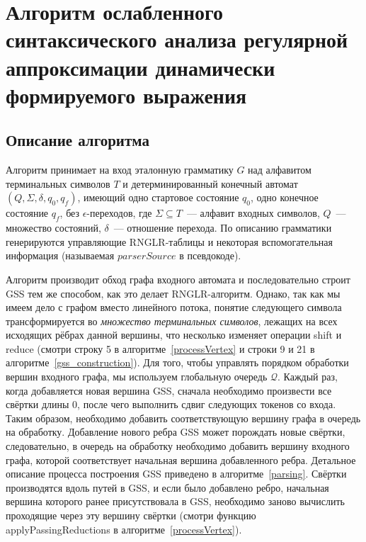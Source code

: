 \section{Алгоритм ослабленного синтаксического анализа регулярной аппроксимации динамически формируемого выражения}

\subsection{Описание алгоритма}
Алгоритм принимает на вход эталонную грамматику $G$ над алфавитом терминальных символов $T$ и детерминированный конечный автомат $(Q,\Sigma,\delta,q_0,q_f)$, имеющий одно стартовое состояние $q_0$, одно конечное состояние $q_f$, без $\epsilon$-переходов, где $\Sigma \subseteq T$~--- алфавит входных символов, $Q$~--- множество состояний, $\delta$~--- отношение перехода. По описанию  грамматики генерируются управляющие RNGLR-таблицы и некоторая вспомогательная информация (называемая $parserSource$ в псевдокоде).

Алгоритм производит обход графа входного автомата и последовательно строит GSS тем же способом, как это делает RNGLR-алгоритм. Однако, так как мы имеем дело с графом вместо линейного потока, понятие следующего символа трансформируется во \emph{множество терминальных символов}, лежащих на всех исходящих рёбрах данной вершины, что несколько изменяет операции shift и reduce (смотри строку 5 в алгоритме~\ref{processVertex} и строки 9 и 21 в алгоритме~\ref{gss_construction}). Для того, чтобы управлять порядком обработки вершин входного графа, мы используем глобальную очередь $\mathcal{Q}$. Каждый раз, когда добавляется новая вершина GSS, сначала необходимо произвести все свёртки длины 0, после чего выполнить сдвиг следующих токенов со входа. Таким образом, необходимо добавить соответствующую вершину графа в очередь на обработку. Добавление нового ребра GSS может порождать новые свёртки, следовательно, в очередь на обработку необходимо добавить вершину входного графа, которой соответствует начальная вершина добавленного ребра. Детальное описание процесса построения GSS приведено в алгоритме~\ref{parsing}. Свёртки производятся вдоль путей в GSS, и если было добавлено ребро, начальная вершина которого ранее присутствовала в GSS, необходимо заново вычислить проходящие через эту вершину свёртки (смотри функцию applyPassingReductions в алгоритме~\ref{processVertex}).

